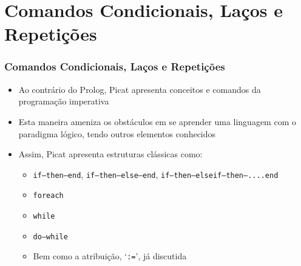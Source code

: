 \section{Comandos Condicionais, Laços e Repetições}

\begin{frame}[fragile]
\frametitle{Comandos Condicionais, Laços e Repetições}
    
  
  \begin{itemize}
      
      \item Ao contrário do Prolog, Picat apresenta
      conceitos e comandos da programação imperativa
      
      \pause
      \item Esta maneira  ameniza os obstáculos
      em se aprender uma linguagem com o paradigma lógico,
      tendo outros elementos conhecidos
  
          \pause
      \item Assim, Picat apresenta estruturas clássicas
      como: 
      \begin{itemize}
        \item  \texttt{if--then--end}, \texttt{if--then--else--end}, \texttt{if--then--elseif--then--....end}
        \item  \texttt{foreach}
        \item  \texttt{while}
        \item  \texttt{do--while}
        \item Bem como a atribuição, `\texttt{:=}', já discutida
      \end{itemize}
   \end{itemize}

       
\end{frame}    
     
    
